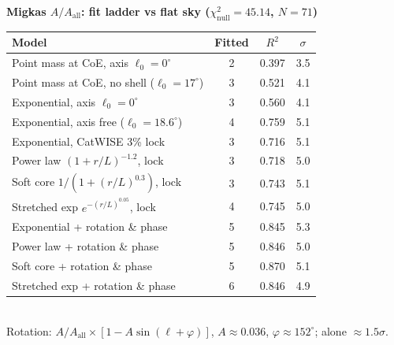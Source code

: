 \documentclass[border=12pt,varwidth=17cm]{standalone}
\begin{document}
\Large
\textbf{Migkas $A/A_{\mathrm{all}}$: fit ladder vs flat sky ($\chi^2_{\text{null}}=45.14$, $N=71$)}\\[6pt]
\begin{tabular}{p{9.2cm}ccc}
\toprule
Model & Fitted & $R^2$ & $\sigma$ \\
\midrule
Point mass at CoE, axis $\ell_0=0^\circ$ & 2 & 0.397 & 3.5\\
Point mass at CoE, no shell ($\ell_0=17^\circ$) & 3 & 0.521 & 4.1\\
Exponential, axis $\ell_0=0^\circ$ & 3 & 0.560 & 4.1\\
Exponential, axis free ($\ell_0=18.6^\circ$) & 4 & 0.759 & 5.1\\
\midrule
Exponential, CatWISE 3\% lock & 3 & 0.716 & 5.1\\
Power law $(1+r/L)^{-1.2}$, lock & 3 & 0.718 & 5.0\\
Soft core $1/(1+(r/L)^{0.3})$, lock & 3 & 0.743 & 5.1\\
Stretched exp $e^{-(r/L)^{0.05}}$, lock & 4 & 0.745 & 5.0\\
\midrule
Exponential + rotation \& phase & 5 & 0.845 & 5.3\\
Power law + rotation \& phase & 5 & 0.846 & 5.0\\
Soft core + rotation \& phase & 5 & 0.870 & 5.1\\
Stretched exp + rotation \& phase & 6 & 0.846 & 4.9\\
\bottomrule
\end{tabular}\\[6pt]
\normalsize Rotation: $A/A_{\mathrm{all}}\times[1-A\sin(\ell+\varphi)]$, $A\approx0.036$, $\varphi\approx152^\circ$; alone $\approx1.5\sigma$.
\end{document}
